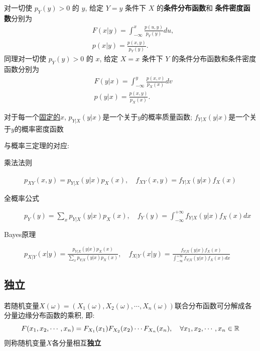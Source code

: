 \begin{definition}
    对一切使 $p_Y(y)>0$ 的 $y$, 给定 $Y=y$ 条件下 $X$ 的\textbf{条件分布函数}和
    \textbf{条件密度函数}分别为
    \begin{align*}
         & F(x | y)=\int_{-\infty}^{x} \frac{p(u, y)}{p_{Y}(y)} du, \\
         & p(x | y)=\frac{p(x, y)}{p_{Y}(y)}.
    \end{align*}
    同理对一切使 $p_Y(y)>0$ 的 $x$, 给定 $X=x$ 条件下 $Y$ 的条件分布函数和条件密度函数分别为
    \begin{align*}
         & F(y | x)=\int_{-\infty}^{y} \frac{p(x, v)}{p_{X}(x)} dv \\
         & p(y | x)=\frac{p(x, y)}{p_{X}(x)}.
    \end{align*}
\end{definition}

\begin{remark}
    对于每一个\underline{固定的$x$}, $p_{Y|X}(y|x)$是一个关于$y$的概率质量函数; $f_{Y|X}(y|x)$是一个关于$y$的概率密度函数
\end{remark}

与概率三定理的对应:
\begin{description}
    \item[乘法法则] $p_{XY}(x,y)=p_{Y|X}(y|x)p_{X}(x), \quad f_{XY}(x,y)=f_{Y|X}(y|x)f_{X}(x)$
    \item[全概率公式] $p_{Y}(y)=\sum_{x}p_{Y|X}(y|x)p_{X}(x), \quad f_{Y}(y)=\int^{+\infty}_{-\infty}f_{Y|X}(y|x)f_{X}(x)dx$
    \item[Bayes原理]  $p_{X|Y}(x|y)=\frac{p_{Y|X}(y|x)p_{X}(x)}{\sum_{x}p_{Y|X}(y|x)p_{X}(x)}, \quad f_{X|Y}(x|y)=\frac{f_{Y|X}(y|x)f_{X}(x)}{\int^{+\infty}_{-\infty}f_{Y|X}(y|x)f_{X}(x)dx}$
\end{description}

\subsection{独立}

\begin{definition}[独立随机变量]
    若随机变量$X(\omega) = (X_1(\omega), X_2(\omega),\cdots , X_n(\omega))$联合分布函数可分解成各分量边缘分布函数的乘积, 即:
    \[ F(x_1,x_2,\cdots ,x_n) = F_{X_1}(x_1)F_{X_2}(x_2)\cdots F_{X_n}(x_n) , \quad \forall x_1,x_2,\cdots ,x_n \in \mathbb{R} \]
    则称随机变量$X$各分量相互\textbf{独立}
\end{definition}

